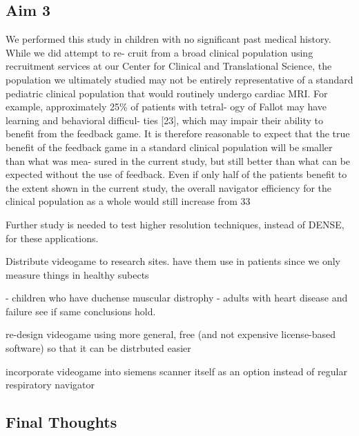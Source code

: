 \subsection{Aim 3}
	We performed this study in children with no significant past medical history. While we did attempt to re- cruit from a broad clinical population using recruitment services at our Center for Clinical and Translational Science, the population we ultimately studied may not be entirely representative of a standard pediatric clinical population that would routinely undergo cardiac MRI. For example, approximately 25\% of patients with tetral- ogy of Fallot may have learning and behavioral difficul- ties [23], which may impair their ability to benefit from the feedback game. It is therefore reasonable to expect that the true benefit of the feedback game in a standard clinical population will be smaller than what was mea- sured in the current study, but still better than what can be expected without the use of feedback. Even if only half of the patients benefit to the extent shown in the current study, the overall navigator efficiency for the clinical population as a whole would still increase from 33 %
	
	Further study is needed to test higher resolution techniques, instead of DENSE, for these applications.
	
	Distribute videogame to research sites. have them use in patients since we only measure things in healthy subects
	
	- children who have duchense muscular distrophy
	- adults with heart disease and failure
	see if same conclusions hold.
	
	re-design videogame using more general, free (and not expensive license-based software) so that it can be distrbuted easier
	
	incorporate videogame into siemens scanner itself as an option instead of regular respiratory navigator
	
\subsection{Final Thoughts}
	
	